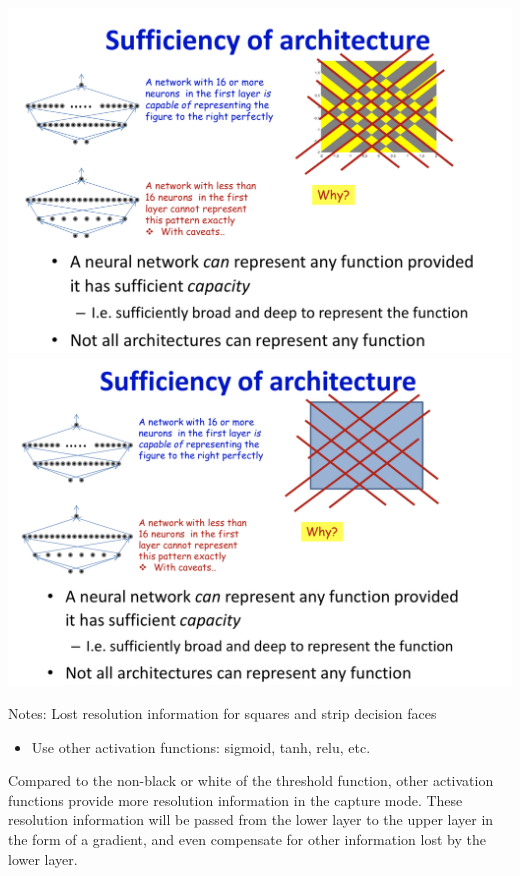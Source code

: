 \documentclass{article}
\begin{document}
	\includegraphics[scale=0.2]{37.png}
	\includegraphics[scale=0.2]{38.png}
	
	Notes: Lost resolution information for squares and strip decision faces
	
	\begin{itemize}
		\item Use other activation functions: sigmoid, tanh, relu, etc.
	\end{itemize}
	
	Compared to the non-black or white of the threshold function, other activation functions provide more resolution information in the capture mode. These resolution information will be passed from the lower layer to the upper layer in the form of a gradient, and even compensate for other information lost by the lower layer.
	
\end{document}
